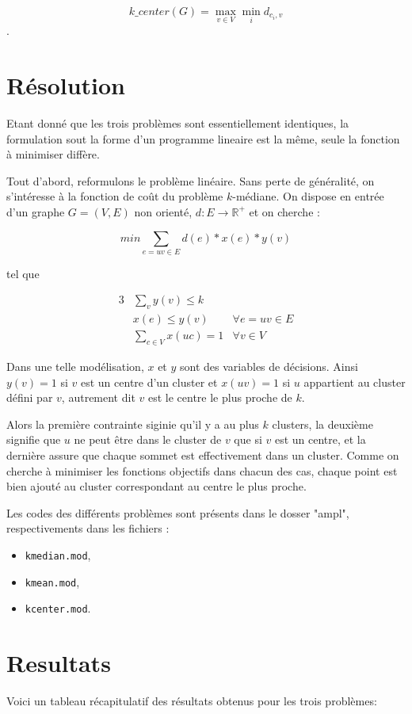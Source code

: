 \documentclass[12pt,a4paper]{article}
\begin{document}
\[ k\_center(G) = \max_{v \in V} \min_i d_{c_i,v} \].

\section*{Résolution}
Etant donné que les trois problèmes sont essentiellement identiques, la formulation sout la forme d'un programme lineaire est la même, seule la fonction à minimiser diffère.

Tout d'abord, reformulons le problème linéaire. Sans perte de généralité, on s'intéresse à la fonction de coût du problème $k$-médiane. On dispose en entrée d'un graphe $G = (V,E)$ non orienté, $d: E \rightarrow \mathbb{R}^+$ et on cherche :

\[ min \sum_{e = uv \in E} d(e) * x(e) * y(v) \]

tel que

\begin{alignat}{3}
& \sum_{v} y(v) \leq k & \\
& x(e) \leq y(v) & \forall e = uv \in E  \\
& \sum_{c \in V} x(uc) = 1 & \forall v \in V
\end{alignat}


Dans une telle modélisation, $x$ et $y$ sont des variables de décisions. Ainsi $y(v) = 1$ si $v$ est un centre d'un cluster et $x(uv) =1$ si $u$ appartient au cluster défini par $v$, autrement dit $v$ est le centre le plus proche de $k$.

Alors la première contrainte siginie qu'il y a au plus $k$ clusters, la deuxième signifie que $u$ ne peut être dans le cluster de $v$ que si $v$ est un centre, et la dernière assure que chaque sommet est effectivement dans un cluster. Comme on cherche à minimiser les fonctions objectifs dans chacun des cas, chaque point est bien ajouté au cluster correspondant au centre le plus proche.

Les codes des différents problèmes sont présents dans le dosser "ampl", respectivements dans les fichiers :
\begin{itemize}
\item \texttt{kmedian.mod}, 
\item \texttt{kmean.mod},
\item \texttt{kcenter.mod}.
\end{itemize}

\pagebreak
\section*{Resultats}
Voici un tableau récapitulatif des résultats obtenus pour les trois problèmes:
\end{document}
